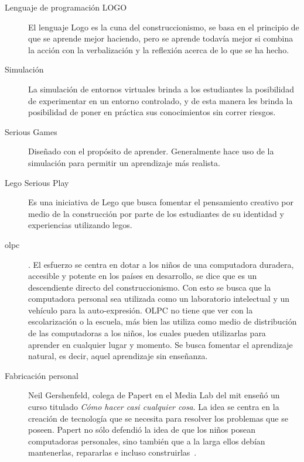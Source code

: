\begin{description}

\item[Lenguaje de programación LOGO] El lenguaje Logo es la cuna del
	construccionismo, se basa en el principio de que se aprende mejor
	haciendo, pero se aprende todavía mejor si combina la acción con la
	verbalización  y la reflexión acerca de lo que se ha hecho.

\item[Simulación] La simulación de entornos virtuales brinda a los estudiantes
	la posibilidad de experimentar en un entorno controlado, y de esta
	manera les brinda la posibilidad de poner en práctica sus conocimientos
	sin correr riesgos.

\item[Serious Games] Diseñado con el propósito de aprender. Generalmente hace
	uso de la simulación para permitir un aprendizaje más realista.

\item[Lego Serious Play] Es una iniciativa de Lego que busca fomentar el
	pensamiento creativo por medio de la construcción por parte de los
	estudiantes de su identidad y experiencias utilizando legos. 

\item[\Gls{olpc}]. El esfuerzo se centra en dotar a los niños de una computadora
	duradera, accesible y potente en los países en desarrollo, se dice que
	es un descendiente directo del construccionismo. Con esto se busca que
	la computadora personal sea utilizada como un laboratorio intelectual y
	un vehículo para la auto-expresión. OLPC no tiene que ver con la
	escolarización o la escuela, más bien las utiliza como medio de
	distribución de las computadoras a los niños, los cuales pueden
	utilizarlas para aprender en cualquier lugar y momento. Se busca
	fomentar el aprendizaje natural, es decir, aquel aprendizaje sin
	enseñanza\cite{papertian:const}.

\item[Fabricación personal] Neil Gershenfeld, colega de Papert en el Media Lab
	del \Gls{mit} enseñó un curso titulado \emph{Cómo hacer casi cualquier
		cosa}. La idea se centra en la creación de tecnología que se
	necesita para resolver los problemas que se poseen. Papert no sólo
	defendió la idea de que los niños posean computadoras personales, sino
	también que a la larga ellos debían mantenerlas, repararlas e incluso
	construirlas~\cite{papertian:const}.

\end{description}

